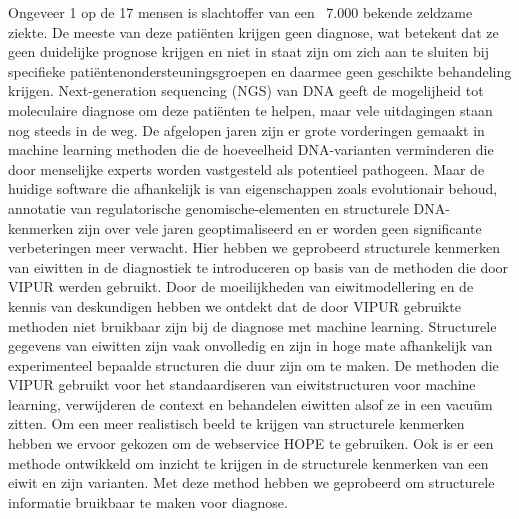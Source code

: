 Ongeveer 1 op de 17 mensen is slachtoffer van een ~7.000 bekende zeldzame ziekte. De meeste van deze patiënten krijgen geen diagnose, wat betekent dat ze geen duidelijke prognose krijgen en niet in staat zijn om zich aan te sluiten bij specifieke patiëntenondersteuningsgroepen en daarmee geen geschikte behandeling krijgen.
Next-generation sequencing (NGS) van DNA geeft de mogelijheid tot moleculaire diagnose om deze patiënten te helpen, maar vele uitdagingen staan ​​nog steeds in de weg.
De afgelopen jaren zijn er grote vorderingen gemaakt in machine learning methoden die de hoeveelheid DNA-varianten verminderen die door menselijke experts worden vastgesteld als potentieel pathogeen.
Maar de huidige software die afhankelijk is van eigenschappen zoals evolutionair behoud, annotatie van regulatorische genomische-elementen en structurele DNA-kenmerken zijn over vele jaren geoptimaliseerd en er worden geen significante verbeteringen meer verwacht.
Hier hebben we geprobeerd structurele kenmerken van eiwitten in de diagnostiek te introduceren op basis van de methoden die door VIPUR werden gebruikt. Door de moeilijkheden van eiwitmodellering en de kennis van deskundigen hebben we ontdekt dat de door VIPUR gebruikte methoden niet bruikbaar zijn bij de diagnose met machine learning. Structurele gegevens van eiwitten zijn vaak onvolledig en zijn in hoge mate afhankelijk van experimenteel bepaalde structuren die duur zijn om te maken. De methoden die VIPUR gebruikt voor het standaardiseren van eiwitstructuren voor machine learning, verwijderen de context en behandelen eiwitten alsof ze in een vacuüm zitten. Om een ​​meer realistisch beeld te krijgen van structurele kenmerken hebben we ervoor gekozen om de webservice HOPE te gebruiken. Ook is er een methode ontwikkeld om inzicht te krijgen in de structurele kenmerken van een eiwit en zijn varianten. Met deze method hebben we geprobeerd om structurele informatie bruikbaar te maken voor diagnose.
